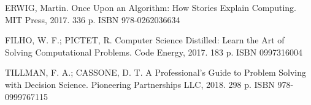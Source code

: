{{        ERWIG, Martin. Once Upon an Algorithm: How Stories Explain Computing. MIT Press, 2017. 336 p. ISBN 978-0262036634

        FILHO, W. F.; PICTET, R. Computer Science Distilled: Learn the Art of Solving Computational Problems. Code Energy, 2017. 183 p. ISBN 0997316004

        TILLMAN, F. A.; CASSONE, D. T. A Professional's Guide to Problem Solving with Decision Science. Pioneering Partnerships LLC, 2018. 298 p. ISBN 978-0999767115
    }
}